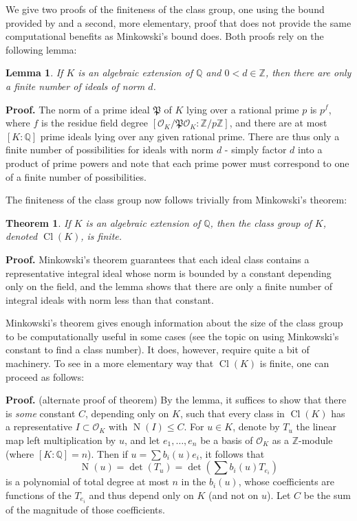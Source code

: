 \documentclass[12pt]{article}
\newcommand{\Ints}{\mathbb{Z}}
\newcommand{\Rats}{\mathbb{Q}}
\newcommand{\bigp}{\mathfrak{P}}
\newcommand{\Alg}{\mathcal{O}}
\DeclareMathOperator{\N}{N}
\DeclareMathOperator{\Cl}{Cl}
\newtheorem{thm}{Theorem}
\newtheorem{lem}{Lemma}
\begin{document}
We give two proofs of the finiteness of the class group, one using the bound provided by  and a second, more elementary, proof that does not provide the same computational benefits as Minkowski's bound does. Both proofs rely on the following lemma:
\begin{lem} If $K$ is an algebraic extension of $\Rats$ and $0<d\in\Ints$, then there are only a finite number of ideals of norm $d$.
\end{lem}
\textbf{Proof. }
\newline
The norm of a prime ideal $\bigp$ of $K$ lying over a rational prime $p$ is $p^f$, where $f$ is the residue field degree $[\Alg_K/\bigp\Alg_K:\Ints/p\Ints]$, and there are at most $[K:\Rats]$ prime ideals lying over any given rational prime. There are thus only a finite number of possibilities for ideals with norm $d$ - simply factor $d$ into a product of prime powers and note that each prime power must correspond to one of a finite number of possibilities.


The finiteness of the class group now follows trivially from Minkowski's theorem:
\begin{thm} If $K$ is an algebraic extension of $\Rats$, then the class group of $K$, denoted $\Cl(K)$, is finite.
\end{thm}
\textbf{Proof. }
\newline
Minkowski's theorem guarantees that each ideal class contains a representative integral ideal whose norm is bounded by a constant depending only on the field, and the lemma shows that there are only a finite number of integral ideals with norm less than that constant.

Minkowski's theorem gives enough information about the size of the class group to be computationally useful in some cases (see the topic on using Minkowski's constant to find a class number). It does, however, require quite a bit of machinery. To see in a more elementary way that $\Cl(K)$ is finite, one can proceed as follows:

\textbf{Proof. } (alternate proof of theorem)
\newline
By the lemma, it suffices to show that there is \emph{some} constant $C$, depending only on $K$, such that every class in $\Cl(K)$ has a representative $I\subset\Alg_K$ with $\N(I)\leq C$.
For $u\in K$, denote by $T_u$ the linear map left multiplication by $u$, and let $e_1,\ldots,e_n$ be a basis of $\Alg_K$ as a $\Ints$-module (where $[K:\Rats]=n$). Then if $u=\sum b_i(u)e_i$, it follows that
\[\N(u) = \det(T_u)=\det\left(\sum b_i(u)T_{e_i}\right)\]
is a polynomial of total degree at most $n$ in the $b_i(u)$, whose coefficients are functions of the $T_{e_i}$ and thus depend only on $K$ (and not on $u$). Let $C$ be the sum of the magnitude of those coefficients.
\end{document}
